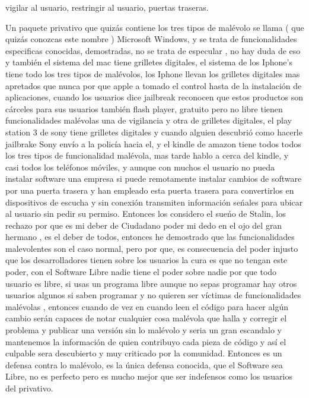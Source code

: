 \begin{multicols}{2}
\begin{entradilla} %
{\em {\color{introcolor}{Funcionalidades malévolas: }}}vigilar al usuario, restringir al usuario,  puertas traseras.
\end{entradilla}


Un paquete privativo que quizás contiene los tres tipos de malévolo se llama  ( que quizás conozcas este nombre ) Microsoft Windows, y se trata de funcionalidades especificas conocidas, demostradas, no se trata de especular , no hay duda de eso y también el sistema del mac tiene grilletes digitales, el sistema de los Iphone's tiene todo los tres tipos de malévolos, los Iphone llevan los grilletes digitales mas apretados que nunca por que apple a tomado el control hasta de la instalación de aplicaciones, cuando los usuarios dice jailbreak reconocen  que estos productos son cárceles para sus usuarios también flash player, gratuito pero no libre tienen funcionalidades malévolas una de vigilancia y otra de grilletes digitales, el play station 3 de sony tiene grilletes digitales  y cuando alguien descubrió como hacerle jailbrake Sony envío a la policía hacia el,  y el kindle de amazon tiene todos todos los tres tipos de funcionalidad malévola, mas tarde hablo a cerca del kindle, y casi todos los teléfonos móviles, y aunque con muchos el usuario no pueda instalar software una empresa si puede remotamente instalar cambios de software por una puerta trasera y han empleado esta puerta trasera para convertirlos en dispositivos de escucha y sin conexión transmiten información seńales para ubicar al usuario sin pedir su permiso. Entonces los considero el sueńo de Stalin, los rechazo por que es mi deber de Ciudadano  poder mi dedo en el ojo del gran hermano , es el deber de todos, entonces he demostrado que las funcionalidades malevolentes son el caso normal, pero por que, es consecuencia del poder injusto que los desarrolladores tienen sobre los usuarios la cura es que no tengan este poder, con el Software Libre nadie tiene el poder sobre nadie por que todo usuario es libre, si usas un programa libre aunque no sepas programar hay otros usuarios algunos si saben programar y no quieren ser víctimas de funcionalidades malévolas , entonces cuando de vez en cuando leen el código para hacer algún cambio serán capaces de notar cualquier cosa malévola que halla y corregir el problema y publicar una versión sin lo malévolo y seria un gran escandalo y mantenemos la información de quien contribuyo cada pieza de código y así el culpable sera descubierto y muy criticado por la comunidad. Entonces es un defensa contra lo malévolo, es la única defensa conocida, que el Software sea Libre, no es perfecto pero es mucho mejor que ser indefensos como los usuarios del privativo.


\end{multicols}
